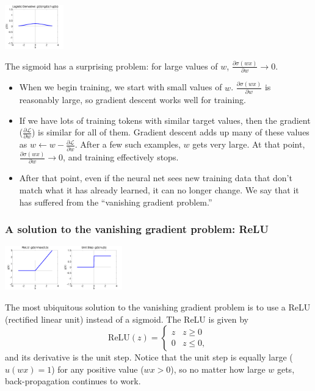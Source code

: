 \documentclass{beamer}
\begin{document}
\begin{frame}
  \centerline{\includegraphics[width=1in]{figs/nn_logisticprime.png}}
  
  The sigmoid has a surprising problem: for large values of $w$,
  $\frac{\partial\sigma(wx)}{\partial{w}}\rightarrow 0$.
  \begin{itemize}
  \item When we begin training, we start with small values of $w$.
    $\frac{\partial\sigma(wx)}{\partial w}$ is
    reasonably large, so gradient descent works well for training.
  \item If we have lots of training tokens with similar target values,
    then the gradient ($\frac{\partial\mathcal{L}}{\partial{w}}$) is
    similar for all of them.  Gradient descent adds up many of these
    values as $w\leftarrow
    w-\frac{\partial{\mathcal{L}}}{\partial{w}}$. After a few such
    examples, $w$ gets very large.  At that point,
    $\frac{\partial\sigma(wx)}{\partial{w}}\rightarrow 0$, and
    training effectively stops.
  \item After that point, even if the neural net sees new training
    data that don't match what it has already learned, it can no
    longer change.  We say that it has suffered from the ``vanishing
    gradient problem.''
  \end{itemize}
\end{frame}
    
\begin{frame}
  \frametitle{A solution to the vanishing gradient problem: ReLU}
  \centerline{\includegraphics[width=1in]{figs/nn_relu.png}\includegraphics[width=1in]{figs/nn_unitstep.png}}

  The most ubiquitous solution to the vanishing gradient problem is to
  use a ReLU (rectified linear unit) instead of a sigmoid.  The ReLU
  is given by
  \[
  \mbox{ReLU}(z) = \begin{cases}
    z & z\ge 0\\
    0 & z\le 0,
  \end{cases}
  \]
  and its derivative is the unit step.  Notice that the
  unit step is equally large ($u(wx)=1$)  for any positive value ($wx>0$), so
  no matter how large $w$ gets, back-propagation continues to work.
\end{frame}
\end{document}
